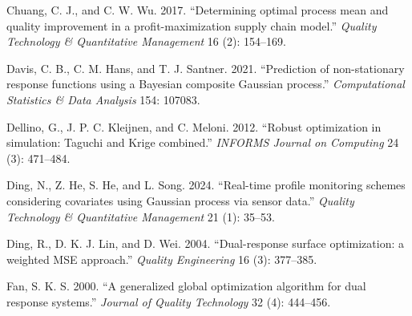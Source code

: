 \documentclass[]{interact}
\theoremstyle{plain}%
\theoremstyle{definition}
\theoremstyle{remark}
\begin{document}
\begin{thebibliography}{}
Chuang, C. J., and C. W. Wu. 2017. ``Determining optimal process mean and quality improvement in a profit-maximization supply chain model.'' \emph{Quality Technology \& Quantitative Management} 16 (2): 154--169.




Davis, C. B., C. M. Hans, and T. J. Santner. 2021. ``Prediction of non-stationary response functions using a Bayesian composite Gaussian process.'' \emph{Computational Statistics \& Data Analysis} 154: 107083.

Dellino, G., J. P. C. Kleijnen, and C. Meloni. 2012. ``Robust optimization in simulation: Taguchi and Krige combined.'' \emph{INFORMS Journal on Computing} 24 (3): 471--484.

Ding, N., Z. He, S. He, and L. Song. 2024. ``Real-time profile monitoring schemes considering covariates using Gaussian process via sensor data.'' \emph{Quality Technology \& Quantitative Management} 21 (1): 35--53.


Ding, R., D. K. J. Lin, and D. Wei. 2004. ``Dual-response surface optimization: a weighted MSE approach.'' \emph{Quality Engineering} 16 (3): 377--385.


Fan, S. K. S. 2000. ``A generalized global optimization algorithm for dual response systems.'' \emph{Journal of Quality Technology} 32 (4): 444--456.


\end{thebibliography}
\end{document}
